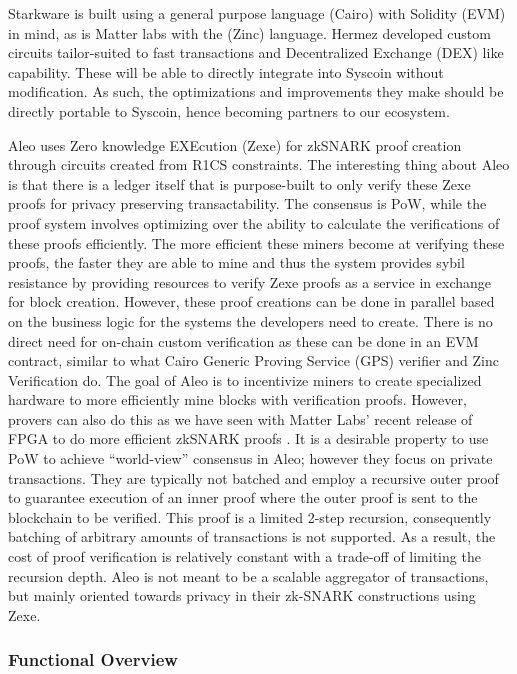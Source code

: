 \documentclass[peerreview]{ieeesyscoin}
\begin{document}
Starkware is built using a general purpose language (Cairo) with Solidity (EVM) in mind, as is Matter labs with the (Zinc) language. Hermez developed custom circuits tailor-suited to fast transactions and Decentralized Exchange (DEX) like capability. These will be able to directly integrate into Syscoin without modification. As such, the optimizations and improvements they make should be directly portable to Syscoin, hence becoming partners to our ecosystem.

Aleo uses Zero knowledge EXEcution (Zexe) for zkSNARK proof creation through circuits created from R1CS constraints. The interesting thing about Aleo is that there is a ledger itself that is purpose-built to only verify these Zexe proofs for privacy preserving transactability. The consensus is PoW, while the proof system involves optimizing over the ability to calculate the verifications of these proofs efficiently. The more efficient these miners become at verifying these proofs, the faster they are able to mine and thus the system provides sybil resistance by providing resources to verify Zexe proofs as a service in exchange for block creation. However, these proof creations can be done in parallel based on the business logic for the systems the developers need to create. There is no direct need for on-chain custom verification as these can be done in an EVM contract, similar to what Cairo Generic Proving Service (GPS) verifier and Zinc Verification do. The goal of Aleo is to incentivize miners to create specialized hardware to more efficiently mine blocks with verification proofs. However, provers can also do this as we have seen with Matter Labs’ recent release of FPGA to do more efficient zkSNARK proofs \cite{Glu20}. It is a desirable property to use PoW to achieve “world-view” consensus in Aleo; however they focus on private transactions. They are typically not batched and employ a recursive outer proof to guarantee execution of an inner proof where the outer proof is sent to the blockchain to be verified. This proof is a limited 2-step recursion, consequently batching of arbitrary amounts of transactions is not supported. As a result, the cost of proof verification is relatively constant with a trade-off of limiting the recursion depth. Aleo is not meant to be a scalable aggregator of transactions, but mainly oriented towards privacy in their zk-SNARK constructions using Zexe.


\subsubsection{Functional Overview}
\end{document}
